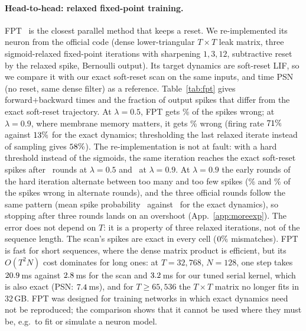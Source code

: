 \documentclass[10pt]{article}
\theoremstyle{remark}
\begin{document}
\paragraph{Head-to-head: relaxed fixed-point training.}
FPT~\citep{feng2025fpt} is the closest parallel method that keeps a reset. We re-implemented its neuron from the official code (dense lower-triangular $T\times T$ leak matrix, three sigmoid-relaxed fixed-point iterations with sharpening $1,3,12$, subtractive reset by the relaxed spike, Bernoulli output). Its target dynamics are soft-reset LIF, so we compare it with our exact soft-reset scan on the same inputs, and time PSN~\citep{fang2023psn} (no reset, same dense filter) as a reference. Table~\ref{tab:fpt} gives forward+backward times and the fraction of output spikes that differ from the exact soft-reset trajectory. At $\lambda=0.5$, FPT gets \FptErrHalf\% of the spikes wrong; at $\lambda=0.9$, where membrane memory matters, it gets \FptErrNine\% wrong (firing rate $71\%$ against $13\%$ for the exact dynamics; thresholding the last relaxed iterate instead of sampling gives $58\%$). The re-implementation is not at fault: with a hard threshold instead of the sigmoids, the same iteration reaches the exact soft-reset spikes after \FptHardRoundsHalf\ rounds at $\lambda=0.5$ and \FptHardRoundsNine\ at $\lambda=0.9$. At $\lambda=0.9$ the early rounds of the hard iteration alternate between too many and too few spikes (\FptOscA\% and \FptOscB\% of the spikes wrong in alternate rounds), and the three official rounds follow the same pattern (mean spike probability \FptRoundRates\ against \FptExactRateCpu\ for the exact dynamics), so stopping after three rounds lands on an overshoot (App.~\ref{app:moreexp}). The error does not depend on $T$: it is a property of three relaxed iterations, not of the sequence length. The scan's spikes are exact in every cell ($0\%$ mismatches). FPT is fast for short sequences, where the dense matrix product is efficient, but its $O(T^2N)$ cost dominates for long ones: at $T=32{,}768$, $N=128$, one step takes $20.9$\,ms against $2.8$\,ms for the scan and $3.2$\,ms for our tuned serial kernel, which is also exact (PSN: $7.4$\,ms), and for $T\ge 65{,}536$ the $T\times T$ matrix no longer fits in 32\,GB. FPT was designed for training networks in which exact dynamics need not be reproduced; the comparison shows that it cannot be used where they must be, e.g.\ to fit or simulate a neuron model.

\begin{table}[t]
\centering\small
\setlength{\tabcolsep}{3pt}

\caption{FPT (re-implemented from the official code) and PSN vs.\ our soft-reset kernels (RTX~5090, forward+backward, ms, median of 5; inputs $\mathcal N(0.15,0.4^2)$). ``Spikes wrong'': fraction of output entries that differ from the exact soft-reset trajectory with leak $\lambda$ (FPT: Bernoulli output). PSN has no reset; it is timed only.}
\label{tab:fpt}
\end{table}
\end{document}
